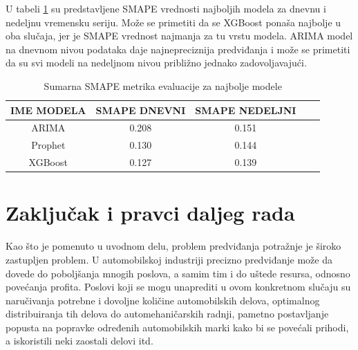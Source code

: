 \documentclass[12pt,oneside]{memoir}
\begin{document}
U tabeli \ref{tbl: sumarna_metrika} su predstavljene SMAPE vrednosti najboljih modela za dnevnu i nedeljnu vremensku seriju. Može se primetiti da se XGBoost ponaša najbolje u oba slučaja, jer je SMAPE vrednost najmanja za tu vrstu modela. ARIMA model na dnevnom nivou podataka daje najnepreciznija predviđanja i može se primetiti da su svi modeli na nedeljnom nivou približno jednako zadovoljavajući. 

\begin{table}[!ht]
\centering
\caption{Sumarna SMAPE metrika evaluacije za najbolje modele}
\label{tbl: sumarna_metrika}
\begin{tabular}{ |c|c|c|c|c|} 
\hline
IME MODELA & SMAPE DNEVNI & SMAPE NEDELJNI \\
\hline
ARIMA & 0.208 & 0.151\\
Prophet & 0.130 & 0.144\\ 
XGBoost & 0.127 & 0.139\\
\hline
\end{tabular}
\end{table}

\chapter{Zaključak i pravci daljeg rada}
Kao što je pomenuto u uvodnom delu, problem predviđanja potražnje je široko zastupljen problem. U automobilskoj industriji precizno predviđanje može da dovede do poboljšanja mnogih poslova, a samim tim i do uštede resursa, odnosno povećanja profita. Poslovi koji se mogu unaprediti u ovom konkretnom slučaju su naručivanja potrebne i dovoljne količine automobilskih delova, optimalnog distribuiranja tih delova do automehaničarskih radnji, pametno postavljanje popusta na popravke određenih automobilskih marki kako bi se povećali prihodi, a iskoristili neki zaostali delovi itd.
\end{document}
